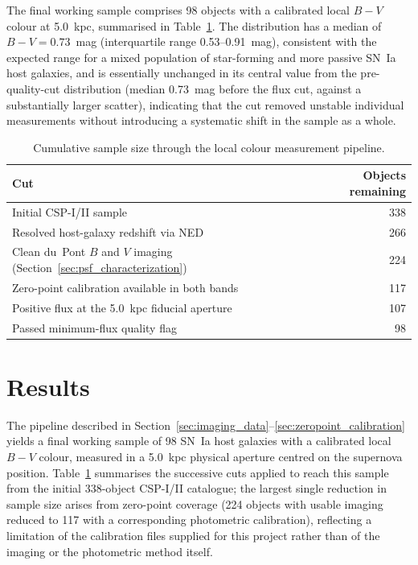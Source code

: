 \documentclass[12pt]{article}
\begin{document}
The final working sample comprises 98 objects with a calibrated local $B-V$ colour at 5.0~kpc, summarised in Table~\ref{tab:final_sample_cuts}. The distribution has a median of $B-V = 0.73$~mag (interquartile range 0.53--0.91~mag), consistent with the expected range for a mixed population of star-forming and more passive SN~Ia host galaxies, and is essentially unchanged in its central value from the pre-quality-cut distribution (median 0.73~mag before the flux cut, against a substantially larger scatter), indicating that the cut removed unstable individual measurements without introducing a systematic shift in the sample as a whole.

\begin{table}[h]
\centering
\caption{Cumulative sample size through the local colour measurement pipeline.}
\label{tab:final_sample_cuts}
\begin{tabular}{lr}
\toprule
Cut & Objects remaining \\
\midrule
Initial CSP-I/II sample & 338 \\
Resolved host-galaxy redshift via NED & 266 \\
Clean du~Pont $B$ and $V$ imaging (Section~\ref{sec:psf_characterization}) & 224 \\
Zero-point calibration available in both bands & 117 \\
Positive flux at the 5.0~kpc fiducial aperture & 107 \\
Passed minimum-flux quality flag & 98 \\
\bottomrule
\end{tabular}
\end{table}

\section{Results}
\label{sec:results}

The pipeline described in Section~\ref{sec:imaging_data}--\ref{sec:zeropoint_calibration} yields a final working sample of 98 SN~Ia host galaxies with a calibrated local $B-V$ colour, measured in a 5.0~kpc physical aperture centred on the supernova position. Table~\ref{tab:final_sample_cuts} summarises the successive cuts applied to reach this sample from the initial 338-object CSP-I/II catalogue; the largest single reduction in sample size arises from zero-point coverage (224 objects with usable imaging reduced to 117 with a corresponding photometric calibration), reflecting a limitation of the calibration files supplied for this project rather than of the imaging or the photometric method itself.
\end{document}
